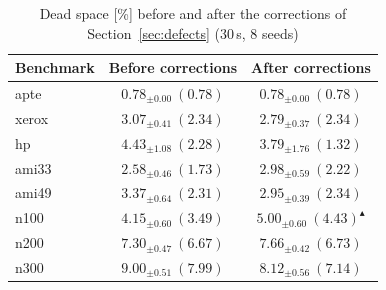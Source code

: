 \begin{table}
\centering
\small
\begin{tabular}{@{}lcc@{}}
\toprule
Benchmark & Before corrections & After corrections \\
\midrule
apte & $0.78_{\pm 0.00}\ (0.78)$ & $0.78_{\pm 0.00}\ (0.78)$ \\
xerox & $3.07_{\pm 0.41}\ (2.34)$ & $2.79_{\pm 0.37}\ (2.34)$ \\
hp & $4.43_{\pm 1.08}\ (2.28)$ & $3.79_{\pm 1.76}\ (1.32)$ \\
ami33 & $2.58_{\pm 0.46}\ (1.73)$ & $2.98_{\pm 0.59}\ (2.22)$ \\
ami49 & $3.37_{\pm 0.64}\ (2.31)$ & $2.95_{\pm 0.39}\ (2.34)$ \\
n100 & $4.15_{\pm 0.60}\ (3.49)$ & $5.00_{\pm 0.60}\ (4.43)^{\blacktriangle}$ \\
n200 & $7.30_{\pm 0.47}\ (6.67)$ & $7.66_{\pm 0.42}\ (6.73)$ \\
n300 & $9.00_{\pm 0.51}\ (7.99)$ & $\mathbf{8.12_{\pm 0.56}\ (7.14)}$ \\
\bottomrule
\end{tabular}
\caption{Dead space [\%] before and after the corrections of Section~\ref{sec:defects} (30\,s, 8 seeds)}
\label{tab:rq2fixes}
\end{table}
